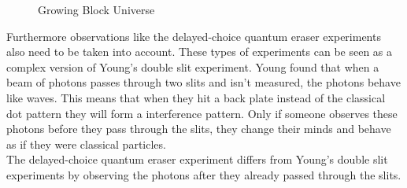 \documentclass[11pt, a4 paper]{article}
\begin{document}
\begin{multicols}{2}
\begin{figure}
\caption{Growing Block Universe \cite{picgrow}}
\label{fig:2}
\end{figure}
Furthermore observations like the delayed-choice quantum eraser experiments also need to be taken into account. These types of experiments can be seen as a complex version of Young's double slit experiment. Young found that when a beam of photons passes through two slits and isn't measured, the photons behave like waves. This means that when they hit a back plate instead of the classical dot pattern they will form a interference pattern. Only if someone observes these photons before they pass through the slits, they change their minds and behave as if they were classical particles.\\
The delayed-choice quantum eraser experiment differs from Young's double slit experiments by observing the photons after they already passed through the slits.


\end{multicols}
\end{document}
